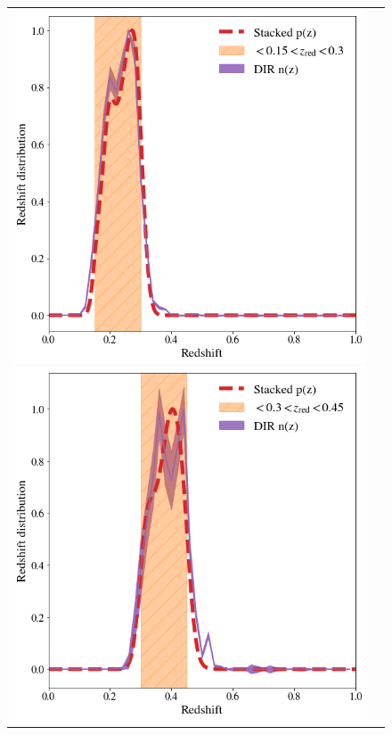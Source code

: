 \documentclass[fleqn,usenatbib,useAMS]{mnras}
\begin{document}



\begin{figure}
\begin{tabular}{cc}
\includegraphics[width=\columnwidth]{figures_tmp/nz_comp_1.png}
\includegraphics[width=\columnwidth]{figures_tmp/nz_comp_2.png}

\end{tabular}
\end{figure}
\end{document}

